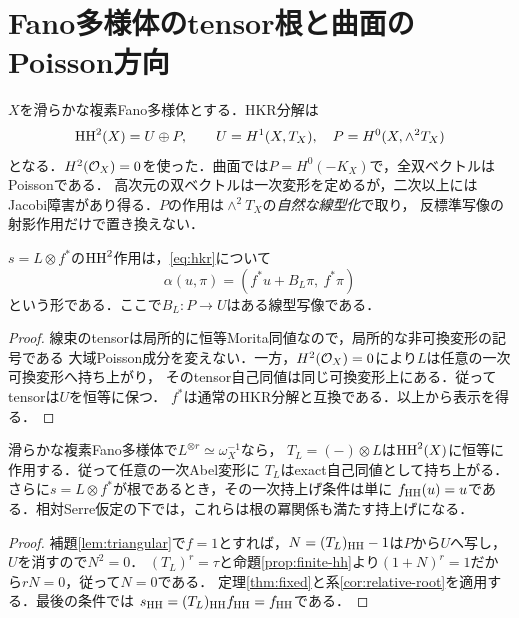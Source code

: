 \section{Fano多様体のtensor根と曲面のPoisson方向}
\label{sec:surface}
$X$を滑らかな複素Fano多様体とする．HKR分解は
\begin{equation}\label{eq:hkr}
 \operatorname{HH}^2(X)=U\oplus P,\qquad U=H^1(X,T_X),\quad P=H^0(X,\wedge^2T_X)
\end{equation}
となる．$H^2(\mathcal O_X)=0$を使った．曲面では$P=H^0(-K_X)$で，全双ベクトルはPoissonである．
高次元の双ベクトルは一次変形を定めるが，二次以上にはJacobi障害があり得る．$P$の作用は$\wedge^2T_X$の\emph{自然な線型化}で取り，
反標準写像の射影作用だけで置き換えない．

\begin{lemma}[三角作用]\label{lem:triangular}
$s=L\otimes f^*$の$\operatorname{HH}^2$作用は，\eqref{eq:hkr}について
\[
 \alpha(u,\pi)=(f^*u+B_L\pi,\ f^*\pi)
\]
という形である．ここで$B_L:P\to U$はある線型写像である．
\end{lemma}
\begin{proof}
線束のtensorは局所的に恒等Morita同値なので，局所的な非可換変形の記号である
大域Poisson成分を変えない．一方，$H^2(\mathcal O_X)=0$により$L$は任意の一次可換変形へ持ち上がり，
そのtensor自己同値は同じ可換変形上にある．従ってtensorは$U$を恒等に保つ．
$f^*$は通常のHKR分解と互換である．以上から表示を得る．
\end{proof}

\begin{theorem}[通常の指数のtensor根は一次変形を制限しない]\label{thm:tensor-root}
滑らかな複素Fano多様体で$L^{\otimes r}\simeq\omega_X^{-1}$なら，
$T_L=(-)\otimes L$は$\operatorname{HH}^2(X)$に恒等に作用する．従って任意の一次Abel変形に
$T_L$はexact自己同値として持ち上がる．
さらに$s=L\otimes f^*$が根であるとき，その一次持上げ条件は単に
$f_{\operatorname{HH}}(u)=u$である．相対Serre仮定の下では，これらは根の冪関係も満たす持上げになる．
\end{theorem}
\begin{proof}
補題\ref{lem:triangular}で$f=1$とすれば，$N=(T_L)_{\operatorname{HH}}-1$は$P$から$U$へ写し，$U$を消すので$N^2=0$．
$(T_L)^r=\tau$と命題\ref{prop:finite-hh}より$(1+N)^r=1$だから$rN=0$，従って$N=0$である．
定理\ref{thm:fixed}と系\ref{cor:relative-root}を適用する．最後の条件では
$s_{\operatorname{HH}}=(T_L)_{\operatorname{HH}}f_{\operatorname{HH}}=f_{\operatorname{HH}}$である．
\end{proof}

